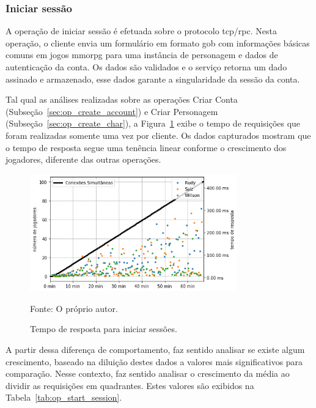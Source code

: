 \subsubsection{Iniciar sessão}
\label{sec:op_start_session}
A operação de iniciar sessão é efetuada sobre o protocolo \ac{tcp}/\ac{rpc}.
%
Nesta operação, o cliente envia um formulário em formato \ac{gob} com informações básicas comuns em jogos \ac{mmorpg} para uma instância de personagem e dados de autenticação da conta.
%
Os dados são validados e o serviço retorna um dado assinado e armazenado, esse dados garante a singularidade da sessão da conta.

Tal qual as análises realizadas sobre as operações Criar Conta (Subseção~\ref{sec:op_create_account}) e Criar Personagem (Subseção~\ref{sec:op_create_char}), a Figura~\ref{fig:start_session_request_time} exibe o tempo de requisições que foram realizadas somente uma vez por cliente.
%
Os dados capturados mostram que o tempo de resposta segue uma tenência linear conforme o crescimento dos jogadores, diferente das outras operações.

\begin{figure}[htb!]
  \caption{Tempo de resposta para iniciar sessões.}
  \vspace{-0.3cm}
  \label{fig:start_session_request_time}
  \includegraphics[width=0.8\textwidth]{figuras/analise/rt/start_session_request_time.png}
  \centering

  \vspace{-0.3cm}
  Fonte: O próprio autor.
\end{figure}



A partir dessa diferença de comportamento, faz sentido analisar se existe algum crescimento, baseado na diluição destes dados a valores mais significativos para comparação.
%
Nesse contexto, faz sentido analisar o crescimento da média ao dividir as requisições em quadrantes.
%
Estes valores são exibidos na Tabela~\ref{tab:op_start_session}.

